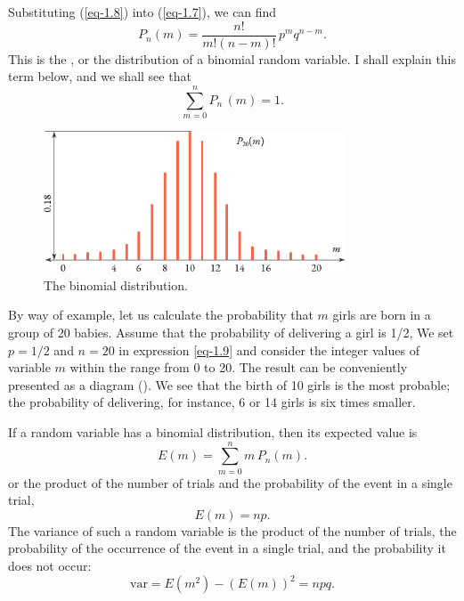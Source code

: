 Substituting (\ref{eq-1.8}) into (\ref{eq-1.7}), we can find
\begin{equation}%
P_{n}(m) = \frac{n!}{m! (n-m)!} \, p^{m}q^{n-m}.
\label{eq-1.9}
\end{equation}
This is the , or the distribution of a binomial
random variable. I shall explain this term below, and we shall see that
\begin{equation}%
\sum_{m=0}^{n}  P_{n}\,(m) = 1.
\label{eq-1.10}
\end{equation}


\begin{figure}[!h]
 \centering
 \includegraphics[width=0.8\textwidth]{figures/binomial-dist.pdf}
\caption{The binomial distribution. \label{binomial-dist}}
 \end{figure}


By way of example, let us calculate the probability that $m$ girls are
born in a group of 20 babies. Assume that the probability of delivering
a girl is 1/2, We set $p= 1/2$ and $n = 20$ in expression \eqref{eq-1.9} and consider the integer values of variable $m$ within the range from 0 to 20. The result can be conveniently presented as a diagram (). We see that the birth of 10 girls is the most probable; the probability of delivering, for instance, 6 or 14 girls is six times smaller.

If a random variable has a binomial distribution, then its expected
value is
\begin{equation*}
E(m) = \sum_{m=0}^{n} m \, P_{n}(m).
\end{equation*}
or the product of the number of trials and the probability of the event
in a single trial,
\begin{equation}%
E(m) = np.
\label{eq-1.11}
\end{equation}
The variance of such a random variable is the product of the number of
trials, the probability of the occurrence of the event in a single trial, and
the probability it does not occur:
\begin{equation}%
\textrm{var} = E(m^{2}) - (E(m))^2 = npq.
\label{eq-1.12}
\end{equation}


